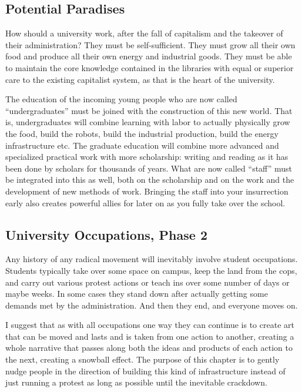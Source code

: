 \subsection{Potential Paradises}\label{potential-paradises}

How should a university work, after the fall of capitalism and the
takeover of their administration? They must be self-sufficient. They
must grow all their own food and produce all their own energy and
industrial goods. They must be able to maintain the core knowledge
contained in the libraries with equal or superior care to the existing
capitalist system, as that is the heart of the university.

The education of the incoming young people who are now called
``undergraduates'' must be joined with the construction of this new
world. That is, undergraduates will combine learning with labor to
actually physically grow the food, build the robots, build the
industrial production, build the energy infrastructure etc. The graduate
education will combine more advanced and specialized practical work with
more scholarship: writing and reading as it has been done by scholars
for thousands of years. What are now called ``staff'' must be integrated
into this as well, both on the scholarship and on the work and the
development of new methods of work. Bringing the staff into your
insurrection early also creates powerful allies for later on as you
fully take over the school.

\subsection{University Occupations, Phase
2}\label{university-occupations-phase-2}

Any history of any radical movement will inevitably involve student
occupations. Students typically take over some space on campus, keep the
land from the cops, and carry out various protest actions or teach ins
over some number of days or maybe weeks. In some cases they stand down
after actually getting some demands met by the administration. And then
they end, and everyone moves on.

I suggest that as with all occupations one way they can continue is to
create art that can be moved and lasts and is taken from one action to
another, creating a whole narrative that passes along both the ideas and
products of each action to the next, creating a snowball effect. The
purpose of this chapter is to gently nudge people in the direction of
building this kind of infrastructure instead of just running a protest
as long as possible until the inevitable crackdown.

